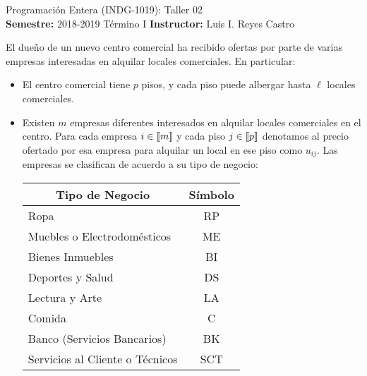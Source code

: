 \documentclass[ a4paper, twoside, 11pt]{article}
\newcommand{\numero}{02}
\begin{document}
\allowdisplaybreaks



\begin{center}
\Large Programaci\'on Entera (INDG-1019): Taller \numero \\[1ex]
\small \textbf{Semestre:} 2018-2019 T\'ermino I \qquad
\textbf{Instructor:} Luis I. Reyes Castro
\end{center}
\fullskip

\begin{problem}
El due\~no de un nuevo centro comercial ha recibido ofertas por parte de varias empresas interesadas en alquilar locales comerciales. En particular: 
\begin{itemize}
\item El centro comercial tiene $p$ pisos, y cada piso puede albergar hasta $\ell$ locales comerciales. %
\item Existen $m$ empresas diferentes interesados en alquilar locales comerciales en el centro. Para cada empresa $i \in \llbracket m \rrbracket$ y cada piso $j \in \llbracket p \rrbracket$ denotamos al precio ofertado por esa empresa para alquilar un local en ese piso como $u_{ij}$. Las empresas se clasifican de acuerdo a su tipo de negocio: 

\begin{table}[htb]
\centering
\begin{tabular}{|l|c|}
\hline
\multicolumn{1}{|c|}{\textbf{Tipo de Negocio}} & \textbf{S\'imbolo} \\ \hline
Ropa                                           & RP                 \\ \hline
Muebles o Electrodom\'esticos                  & ME                 \\ \hline
Bienes Inmuebles                               & BI                 \\ \hline
Deportes y Salud                               & DS                 \\ \hline
Lectura y Arte                                 & LA                 \\ \hline
Comida                                         & C                  \\ \hline
Banco (Servicios Bancarios)                    & BK                 \\ \hline
Servicios al Cliente o T\'ecnicos              & SCT                \\ \hline



\end{tabular}
\end{table}
\end{itemize}
\end{problem}
\end{document}
